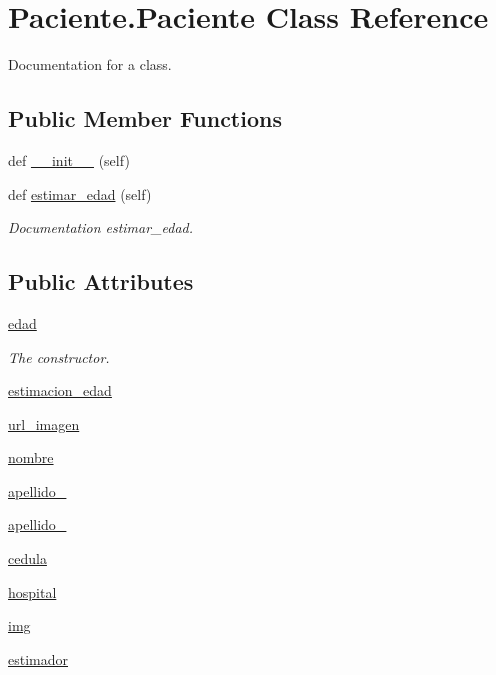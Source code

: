 \hypertarget{class_paciente_1_1_paciente}{}\section{Paciente.\+Paciente Class Reference}
\label{class_paciente_1_1_paciente}


Documentation for a class.  


\subsection*{Public Member Functions}
\begin{DoxyCompactItemize}
\item 
def \mbox{\hyperlink{class_paciente_1_1_paciente_a2c88db03c95c828f1d0f58e9d32ea355}{\+\_\+\+\_\+init\+\_\+\+\_\+}} (self)
\item 
def \mbox{\hyperlink{class_paciente_1_1_paciente_ab86fcc6f30123b2ef9f8900835cfec67}{estimar\+\_\+edad}} (self)
\begin{DoxyCompactList}\small\item\em Documentation estimar\+\_\+edad. \end{DoxyCompactList}\end{DoxyCompactItemize}
\subsection*{Public Attributes}
\begin{DoxyCompactItemize}
\item 
\mbox{\hyperlink{class_paciente_1_1_paciente_abf70fff36082e22e22c2235768375de3}{edad}}
\begin{DoxyCompactList}\small\item\em The constructor. \end{DoxyCompactList}\item 
\mbox{\hyperlink{class_paciente_1_1_paciente_af256a15938714b75d23283e3ff8fad02}{estimacion\+\_\+edad}}
\item 
\mbox{\hyperlink{class_paciente_1_1_paciente_a5af3b0cc2e0a1469d603f2efea44df45}{url\+\_\+imagen}}
\item 
\mbox{\hyperlink{class_paciente_1_1_paciente_a0df4d67d7a1e91c7cc72b14ca7bd7b78}{nombre}}
\item 
\mbox{\hyperlink{class_paciente_1_1_paciente_a5b4864356ffb572e967ac84c8f1ef563}{apellido\+\_}}
\item 
\mbox{\hyperlink{class_paciente_1_1_paciente_aa6013db207c8415f9878c0a292ab954d}{apellido\+\_}}
\item 
\mbox{\hyperlink{class_paciente_1_1_paciente_ad98665ddc10fc8bc5ff0b6a43ee726f1}{cedula}}
\item 
\mbox{\hyperlink{class_paciente_1_1_paciente_a0c4e9e5166be854ff5dad10248fdb85c}{hospital}}
\item 
\mbox{\hyperlink{class_paciente_1_1_paciente_a2dd715404933b0c95678e27418e139f7}{img}}
\item 
\mbox{\hyperlink{class_paciente_1_1_paciente_a16c2170ab585dbc173abe23ca2721997}{estimador}}
\end{DoxyCompactItemize}


